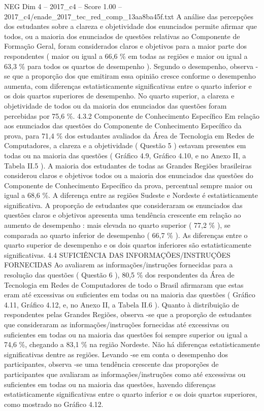 \begin{textsample}{NEG Dim 4 – 2017\_c4 – Score 1.00 – 2017\_c4/enade\_2017\_tec\_red\_comp\_13aa8ba45f.txt}
A análise das percepções dos estudantes sobre a clareza e objetividade dos enunciados permite afirmar que todos, ou a maioria dos enunciados de questões relativas ao Componente de Formação Geral, foram considerados claros e objetivos para a maior parte dos respondentes ( maior ou igual a 66,6 \% em todas as regiões e maior ou igual a 63,3 \% para todos os quartos de desempenho ).
Segundo o desempenho, observa -se que a proporção dos que emitiram essa opinião cresce conforme o desempenho aumenta, com diferenças estatisticamente significativas entre o quarto inferior e os dois quartos superiores de desempenho.
No quarto superior, a clareza e objetividade de todos ou da maioria dos enunciados das questões foram percebidas por 75,6 \%. 4.3.2 Componente de Conhecimento Específico Em relação aos enunciados das questões do Componente de Conhecimento Específico da prova, para 71,4 \% dos estudantes avaliados da Área de Tecnologia em Redes de Computadores, a clareza e a objetividade ( Questão 5 ) estavam presentes em todas ou na maioria das questões ( Gráfico 4.9, Gráfico 4.10, e no Anexo II, a Tabela II.5 ).
A maioria dos estudantes de todas as Grandes Regiões brasileiras considerou claros e objetivos todos ou a maioria dos enunciados das questões do Componente de Conhecimento Específico da prova, percentual sempre maior ou igual a 68,6 \%.
A diferença entre as regiões Sudeste e Nordeste é estatisticamente significativa.
A proporção de estudantes que consideraram os enunciados das questões claros e objetivos apresenta uma tendência crescente em relação ao aumento de desempenho : mais elevada no quarto superior ( 77,2 \% ), se comparada ao quarto inferior de desempenho ( 66,7 \% ).
As diferenças entre o quarto superior de desempenho e os dois quartos inferiores são estatisticamente significativas. 4.4 SUFICIÊNCIA DAS INFORMAÇÕES/INSTRUÇÕES FORNECIDAS Ao avaliarem as informações/instruções fornecidas para a resolução das questões ( Questão 6 ), 80,5 \% dos respondentes da Área de Tecnologia em Redes de Computadores de todo o Brasil afirmaram que estas eram até excessivas ou suficientes em todas ou na maioria das questões ( Gráfico 4.11, Gráfico 4.12, e, no Anexo II, a Tabela II.6 ).
Quanto à distribuição de respondentes pelas Grandes Regiões, observa -se que a proporção de estudantes que consideraram as informações/instruções fornecidas até excessivas ou suficientes em todas ou na maioria das questões foi sempre superior ou igual a 74,6 \%, chegando a 83,1 \% na região Nordeste.
Não há diferenças estatisticamente significativas dentre as regiões.
Levando -se em conta o desempenho dos participantes, observa -se uma tendência crescente das proporções de participantes que avaliaram as informações/instruções como até excessivas ou suficientes em todas ou na maioria das questões, havendo diferenças estatisticamente significativas entre o quarto inferior e os dois quartos superiores, como mostrado no Gráfico 4.12.

\end{textsample}
